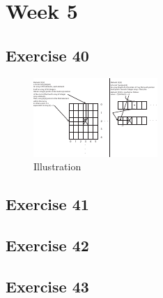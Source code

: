 \documentclass[a4paper]{article}
\let\stdsection\section
\renewcommand\section{\newpage\stdsection}
\begin{document}
\section*{Week 5}

\subsection*{Exercise 40}

\begin{figure}[H]
\centerline{\includegraphics[trim={0 0cm 0 0cm}, scale=5]{../40/illustration.pdf}}
\caption{Illustration}
\end{figure}

\newpage
\subsection*{Exercise 41}


\newpage
\subsection*{Exercise 42}














\newpage
\subsection*{Exercise 43}

\end{document}
